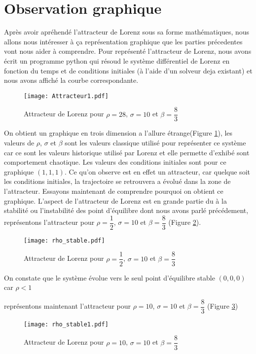\section{Observation graphique}
Après avoir apréhendé l'attracteur de Lorenz sous sa forme mathématiques, nous allons nous intéresser à ça représentation graphique que les parties précedentes vont nous aider à comprendre. Pour représenté l'attracteur de Lorenz, nous avons écrit un programme python qui résoud le système différentiel de Lorenz en fonction du temps et de conditions initiales (à l'aide d'un solveur deja existant) et nous avons affiché la courbe correspondante.

\begin{figure}[!ht]
        \centering
        \texttt{[image: Attracteur1.pdf]}
        \caption{\label{fig:attracteur1}Attracteur de Lorenz pour $\rho=28$, $\sigma=10$ et $\beta=\dfrac{8}{3}$} 
\end{figure} 

On obtient un graphique en trois dimension a l'allure étrange(Figure \ref{fig:attracteur1}), les valeurs de $\rho$, $\sigma$ et $\beta$ sont les valeurs classique utilisé pour représenter ce système car ce sont les valeurs historique utilisé par Lorenz et elle permette d'exhibé sont comportement chaotique. Les valeurs des conditions initiales sont pour ce graphique $(1,1,1)$. Ce qu'on observe est en effet un attracteur, car quelque soit les conditions initiales, la trajectoire se retrouvera a évolué dans la zone de l'attracteur.
Essayons maintenant de comprendre pourquoi on obtient ce graphique. L'aspect de l'attracteur de Lorenz est en grande partie du à la stabilité ou l'instabilité des point d'équilibre dont nous avons parlé précédement, représentons l'attracteur pour $\rho=\dfrac{1}{2}$, $\sigma=10$ et $\beta=\dfrac{8}{3}$ (Figure \ref{fig:rho_stable}).

\begin{figure}[!ht]
    \centering
    \texttt{[image: rho\_stable.pdf]}
    \caption{\label{fig:rho_stable}Attracteur de Lorenz pour $\rho=\dfrac{1}{2}$, $\sigma=10$ et $\beta=\dfrac{8}{3}$} 
\end{figure}
On constate que le système évolue vers le seul point d'équilibre stable $(0,0,0)$ car $\rho<1$

représentons maintenant l'attracteur pour $\rho=10$, $\sigma=10$ et $\beta=\dfrac{8}{3}$ (Figure \ref{fig:rho_stable1})

\begin{figure}[!ht]
    \centering
    \texttt{[image: rho\_stable1.pdf]}
    \caption{\label{fig:rho_stable1}Attracteur de Lorenz pour $\rho=10$, $\sigma=10$ et $\beta=\dfrac{8}{3}$} 
\end{figure}

